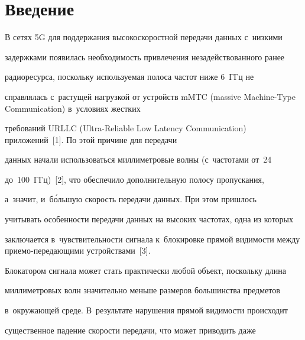 





 \thispagestyle{headings}

 

 \vspace*{-12pt}



\section{Введение}








  В сетях 5G для поддержания высокоскоростной передачи данных с~низкими 

задержками появилась не\-об\-хо\-ди\-мость привлечения незадействованного ранее 

радиоресурса, поскольку ис\-поль\-зу\-емая полоса частот ниже 6~ГГц не 

справлялась с~рас\-ту\-щей на\-груз\-кой от устройств mMTC (massive Machine-Type Communication) в~условиях жест\-ких 

требований URLLC (Ultra-Reliable Low Latency Communication) при\-ло\-же\-ний~[1]. По этой причине для передачи 

данных начали использоваться миллиметровые волны (с~частотами от~24 

до~100~ГГц)~[2], что обеспечило дополнительную полосу пропускания, 

а~значит, и~б\'{о}льшую ско\-рость передачи данных. При этом пришлось 

учитывать особенности передачи данных на высоких частотах, одна из которых 

заключается в~чув\-ст\-ви\-тель\-ности сигнала к~блокировке прямой ви\-ди\-мости между при\-е\-мо-пе\-ре\-да\-ющи\-ми устройствами~[3]. 

Блокатором сигнала может стать практически любой объект, поскольку длина 

мил\-ли\-мет\-ро\-вых волн значительно меньше размеров большинства предметов 

в~окружающей среде. В~результате нарушения прямой ви\-ди\-мости происходит 

существенное падение ско\-рости передачи, что может приводить даже 

